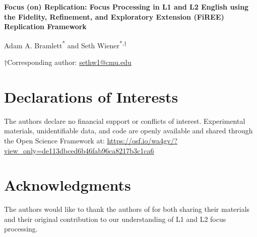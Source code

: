 \documentclass[man, floatsintext, letterpaper, 12pt, donotrepeattitle]{apa7}
\title{} %
\author{} %
\affiliation{} %
\title{} %
\author{}
\affiliation{}
\begin{document}
\begin{titlepage}
\centering
\vspace*{1cm}

{\LARGE \bfseries Focus (on) Replication: Focus Processing in L1 and L2 English using the Fidelity, Refinement, and Exploratory Extension (FiREE) Replication Framework \par}

\vspace{1.5cm}

{\large Adam A. Bramlett\textsuperscript{*} and Seth Wiener\textsuperscript{*,†} \par}

\vspace{1em}


\vspace{1em}

{\small †Corresponding author: \href{mailto:sethw1@cmu.edu}{sethw1@cmu.edu} \par}

\vspace{1.5cm}

\section*{Declarations of Interests}
\noindent The authors declare no financial support or conflicts of interest. Experimental materials, unidentifiable data, and code are openly available and shared through the Open Science Framework at: \url{https://osf.io/wa4gv/?view_only=de113dbced6b46fab96ca8217b3c1ca6}

\vspace{1cm}

\section*{Acknowledgments}
\noindent The authors would like to thank the authors of \cite{ge2021a} for both sharing their materials and their original contribution to our understanding of L1 and L2 focus processing.

\end{titlepage}






%


%
\end{document}
